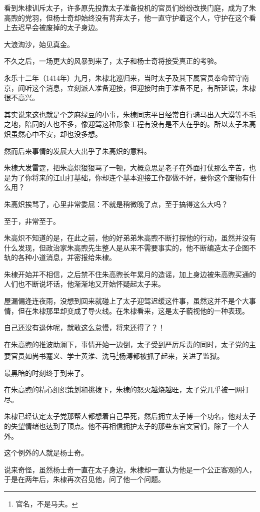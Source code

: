 \begin{multicols}{\theparacolNo}
看到朱棣训斥太子，许多原先投靠太子准备投机的官员们纷纷改换门庭，成为了朱高煦的党羽，但杨士奇却始终没有背弃太子，他一直守护着这个人，守护在这个看上去迟早会被废掉的太子身边。

大浪淘沙，始见真金。

不久之后，一场更大的风暴到来了，太子和杨士奇将接受真正的考验。

永乐十二年（1414年）九月，朱棣北巡归来，当时太子及其下属官员奉命留守南京，闻听这个消息，立刻派人准备迎接，但迎接时由于准备不足，有所延误，朱棣很不高兴。

其实说来这也就是个芝麻绿豆的小事，朱棣同志平日经常自行骑马出入大漠等不毛之地，陪同的人也不多，像迎驾这种形象工程有没有是不大在乎的。所以太子朱高炽虽然心中不安，却也没多想。

然而后来事情的发展大大出乎了朱高炽的意料。

朱棣大发雷霆，把朱高炽狠狠骂了一顿，大概意思是老子在外面打仗那么辛苦，也是为了你将来的江山打基础，你却连个基本迎接工作都做不好，要你这个废物有什么用？

朱高炽挨骂了，心里非常委屈：不就是稍微晚了点，至于搞得这么大吗？

至于，非常至于。

朱高炽不知道的是，在此之前，他的好弟弟朱高煦不断打探他的行动，虽然并没有什么发现，但政治家朱高煦先生整人是从来不需要事实的，他不断编造太子企图不轨的各种小道消息，并密报给朱棣。

朱棣开始并不相信，之后禁不住朱高煦长年累月的造谣，加上身边被朱高煦买通的人们也不断说坏话，他渐渐地又开始怀疑起太子来。

屋漏偏逢连夜雨，没想到回来就碰上了太子迎驾迟缓这件事，虽然这并不是个大事情，但在朱棣那里却变成了导火线。在朱棣看来，这是太子藐视他的一种表现。

自己还没有退休呢，就敢这么怠慢，将来还得了？！

在朱高煦的推波助澜下，事情开始一边倒，太子受到严厉斥责的同时，太子党的主要官员如尚书蹇义、学士黄淮、洗马\footnote{官名，不是马夫。}杨溥都被抓了起来，关进了监狱。

最黑暗的时刻终于到来了。

在朱高煦的精心组织策划和挑拨下，朱棣的怒火越烧越旺，太子党几乎被一网打尽。

朱棣已经认定太子党那帮人都想着自己早死，然后拥立太子博一个功名，他对太子的失望情绪也达到了顶点。他不再相信拥护太子的那些东宫文官们，除了一个人外。

这个例外的人就是杨士奇。

说来奇怪，虽然杨士奇一直在太子身边，朱棣却一直认为他是一个公正客观的人，于是在两年后，朱棣再次召见他，问了他一个问题。


\end{multicols}
